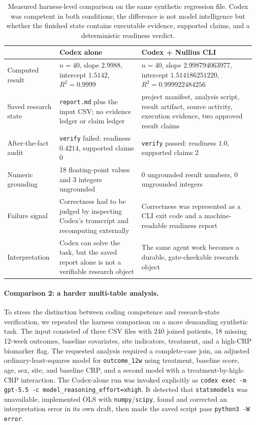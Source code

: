 \documentclass[11pt]{article}
\begin{document}
\begin{table}[h]
\centering
\small
\begin{tabular}{@{}p{}p{}p{}@{}}
\toprule
 & \textbf{Codex alone} & \textbf{Codex + Nullius CLI} \\
\midrule
Computed result & $n=40$, slope $2.9988$, intercept $1.5142$, $R^2=0.9999$ & $n=40$, slope $2.998794063977$, intercept $1.514186251220$, $R^2=0.999922484256$ \\
Saved research state & \texttt{report.md} plus the input CSV; no evidence ledger or claim ledger & project manifest, analysis script, result artifact, source activity, execution evidence, two approved result claims \\
After-the-fact audit & \texttt{verify} failed: readiness $0.4214$, supported claims 0 & \texttt{verify} passed: readiness $1.0$, supported claims 2 \\
Numeric grounding & 18 floating-point values and 3 integers ungrounded & 0 ungrounded result numbers, 0 ungrounded integers \\
Failure signal & Correctness had to be judged by inspecting Codex's transcript and recomputing externally & Correctness was represented as a CLI exit code and a machine-readable readiness report \\
Interpretation & Codex can solve the task, but the saved report alone is not a verifiable research object & The same agent work becomes a durable, gate-checkable research object \\
\bottomrule
\end{tabular}
\caption{Measured harness-level comparison on the same synthetic regression file. Codex was competent in both conditions; the difference is not model intelligence but whether the finished state contains executable evidence, supported claims, and a deterministic readiness verdict.}
\label{tab:codexcli}
\end{table}

\paragraph{Comparison 2: a harder multi-table analysis.}
To stress the distinction between coding competence and research-state verification, we repeated the harness comparison on a more demanding synthetic task. The input consisted of three CSV files with 240 joined patients, 18 missing 12-week outcomes, baseline covariates, site indicators, treatment, and a high-CRP biomarker flag. The requested analysis required a complete-case join, an adjusted ordinary-least-squares model for \texttt{outcome\_12w} using treatment, baseline score, age, sex, site, and baseline CRP, and a second model with a treatment-by-high-CRP interaction. The Codex-alone run was invoked explicitly as \texttt{codex exec -m gpt-5.5 -c model\_reasoning\_effort=xhigh}. It detected that \texttt{statsmodels} was unavailable, implemented OLS with \texttt{numpy}/\texttt{scipy}, found and corrected an interpretation error in its own draft, then made the saved script pass \texttt{python3 -W error}.
\end{document}
